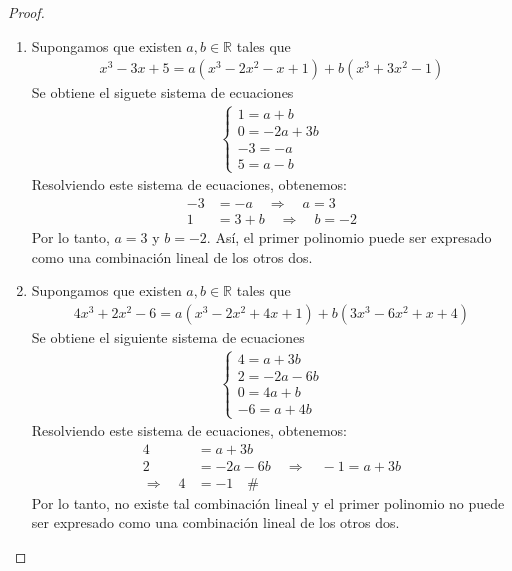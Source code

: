 \documentclass[11pt,letterpaper]{article}
\newcommand{\R}{\mathbb{R}}
\begin{document}
\begin{proof}
    \begin{enumerate}
        \item Supongamos que existen $a,b\in\R$ tales que
        \begin{align*}
            x^3 - 3x + 5 = a(x^3 - 2x^2 - x + 1) + b(x^3 + 3x^2 - 1)
        \end{align*}
        Se obtiene el siguete sistema de ecuaciones
        \begin{align*}
            \begin{cases}
                1 = a + b \\
                0 = -2a + 3b \\
                -3 = -a \\
                5 = a - b
            \end{cases}
        \end{align*}
        Resolviendo este sistema de ecuaciones, obtenemos:
        \begin{align*}
            -3 &= -a \quad \Rightarrow \quad a = 3 \\
            1 &= 3 + b \quad \Rightarrow \quad b = -2
        \end{align*}
        Por lo tanto, $a = 3$ y $b = -2$. Así, el primer polinomio puede ser expresado como una combinación lineal de los otros dos.

        \item Supongamos que existen $a,b\in\R$ tales que
        \begin{align*}
            4x^3 + 2x^2 - 6 = a(x^3 - 2x^2 + 4x + 1) + b(3x^3 - 6x^2 + x + 4)
        \end{align*}
        Se obtiene el siguiente sistema de ecuaciones
        \begin{align*}
            \begin{cases}
                4 = a + 3b \\
                2 = -2a - 6b \\
                0 = 4a + b \\
                -6 = a + 4b
            \end{cases}
        \end{align*}
        Resolviendo este sistema de ecuaciones, obtenemos:
        \begin{align*}
            4 &= a + 3b \\
            2 &= -2a - 6b \quad \Rightarrow \quad -1 = a + 3b \\
            \Rightarrow \quad 4 &= -1 \quad \# 
        \end{align*}
        Por lo tanto, no existe tal combinación lineal y el primer polinomio no puede ser expresado como una combinación lineal de los otros dos.


\end{enumerate}
\end{proof}
\end{document}

